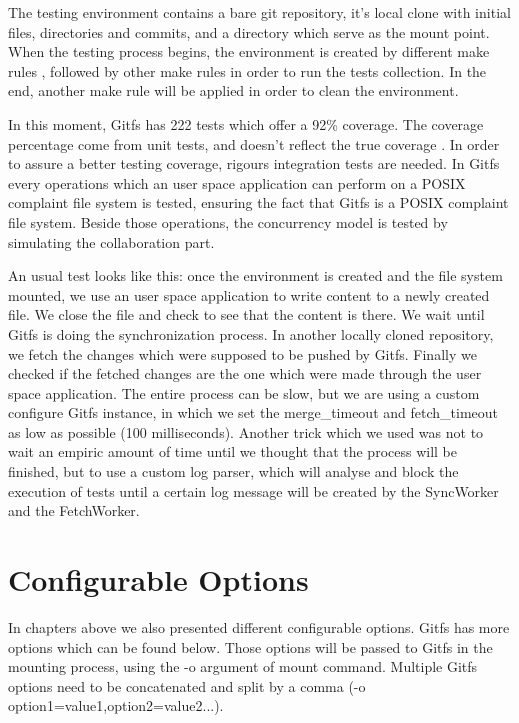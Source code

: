 The testing environment contains a bare git repository, it's local clone with initial files, directories and commits, and a directory which serve as the mount point. When the testing process begins, the environment is created by different make rules \cite{Aham-cumming2015}, followed by other make rules in order to run the tests collection. In the end, another make rule will be applied in order to clean the environment.

In this moment, Gitfs has 222 tests which offer a 92\% coverage. The coverage percentage come from unit tests, and doesn't reflect the true coverage \cite{Inozemtseva2014}. In order to assure a better testing coverage, rigours integration tests are needed. In Gitfs every operations which an user space application can perform on a POSIX complaint file system is tested, ensuring the fact that Gitfs is a POSIX complaint file system. Beside those operations, the concurrency model is tested by simulating the collaboration part.

An usual test looks like this: once the environment is created and the file system mounted, we use an user space application to write content to a newly created file. We close the file and check to see that the content is there. We wait until Gitfs is doing the synchronization process. In another locally cloned repository, we fetch the changes which were supposed to be pushed by Gitfs. Finally we checked if the fetched changes are the one which were made through the user space application. The entire process can be slow, but we are using a custom configure Gitfs instance, in which we set the merge\_timeout and fetch\_timeout as low as possible (100 milliseconds). Another trick which we used was not to wait an empiric amount of time until we thought that the process will be finished, but to use a custom log parser, which will analyse and block the execution of tests until a certain log message will be created by the SyncWorker and the FetchWorker.

\section{Configurable Options}
In chapters above we also presented different configurable options. Gitfs has more options which can be found below. Those options will be passed to Gitfs in the mounting process, using the -o argument of mount command. Multiple Gitfs options need to be concatenated and split by a comma (-o option1=value1,option2=value2...).

